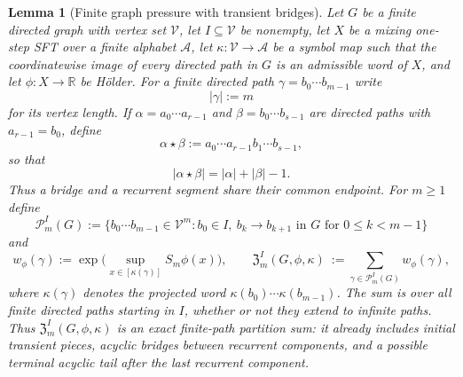\documentclass{etds}%
\numberwithin{equation}{section}
\theoremstyle{plain}
\newtheorem{lemma}[theorem]{Lemma}
\theoremstyle{definition}
\theoremstyle{remark}
\begin{document}
\begin{lemma}[Finite graph pressure with transient bridges]
\label{lem:reachable-component-partition-sums}
Let $G$ be a finite directed graph with vertex set $\mathcal{V}$, let
$I\subseteq\mathcal{V}$ be nonempty, let $X$ be a mixing one-step SFT over a
finite alphabet $\mathcal{A}$, let $\kappa:\mathcal{V}\to\mathcal{A}$ be a
symbol map such that the coordinatewise image of every directed path in $G$ is
an admissible word of $X$, and let $\phi:X\to\mathbb{R}$ be H\"older.  For a
finite directed path $\gamma=b_0\cdots b_{m-1}$ write
\[
|\gamma|:=m
\]
for its vertex length.  If $\alpha=a_0\cdots a_{r-1}$ and
$\beta=b_0\cdots b_{s-1}$ are directed paths with $a_{r-1}=b_0$, define
\[
\alpha\star\beta:=a_0\cdots a_{r-1}b_1\cdots b_{s-1},
\]
so that
\[
|\alpha\star\beta|=|\alpha|+|\beta|-1.
\]
Thus a bridge and a recurrent segment share their common endpoint.  For
$m\ge 1$ define
\[
\mathcal{P}_m^I(G)
:=\{b_0\cdots b_{m-1}\in\mathcal{V}^m:
b_0\in I,\ b_k\to b_{k+1}\text{ in }G\text{ for }0\le k<m-1\}
\]
and
\[
w_\phi(\gamma)
:=\exp\!\bigl(\sup_{x\in[\kappa(\gamma)]}S_m\phi(x)\bigr),
\qquad
\mathfrak{Z}_m^I(G,\phi,\kappa)
\ :=\sum_{\gamma\in\mathcal{P}_m^I(G)} w_\phi(\gamma),
\]
where $\kappa(\gamma)$ denotes the projected word
$\kappa(b_0)\cdots\kappa(b_{m-1})$.  The sum is over all finite directed paths
starting in $I$, whether or not they extend to infinite paths.  Thus
$\mathfrak{Z}_m^I(G,\phi,\kappa)$ is an exact finite-path partition sum: it
already includes initial transient pieces, acyclic bridges between recurrent
components, and a possible terminal acyclic tail after the last recurrent
component.


\end{lemma}
\end{document}
